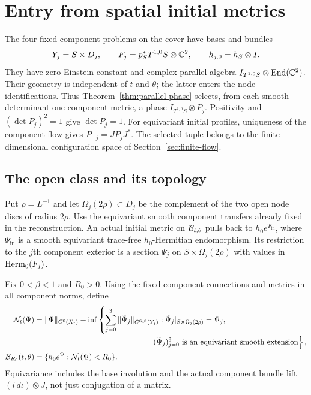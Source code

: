 \section{Entry from spatial initial metrics}\label{sec:spatial-entry}

The four fixed component problems on the cover have bases and bundles
\begin{equation}\label{eq:component-bundles}
 Y_j=S\times D_j,\qquad F_j=p_S^*T^{1,0}S\otimes\mathbb C^2,
 \qquad h_{j,0}=h_S\otimes I.
\end{equation}
They have zero Einstein constant and complex parallel algebra
$I_{T^{1,0}S}\otimes\operatorname{End}(\mathbb C^2)$. Their geometry is independent of
$t$ and $\theta$; the latter enters the node identifications. Thus
Theorem~\ref{thm:parallel-phase} selects, from each smooth
determinant-one component metric, a phase $I_{T^{1,0}S}\otimes P_j$.
Positivity and $(\det P_j)^2=1$ give $\det P_j=1$. For equivariant
initial profiles, uniqueness of the component flow gives
$P_{-j}=JP_jJ^*$. The selected tuple belongs to the finite-dimensional
configuration space of Section~\ref{sec:finite-flow}.

\subsection{The open class and its topology}
Put $\rho=L^{-1}$ and let $\Omega_j(2\rho)\subset D_j$ be the
complement of the two open node discs of radius $2\rho$. Use the
equivariant smooth component transfers already fixed in the
reconstruction. An actual initial metric on $\mathcal B_{t,\theta}$ pulls
back to $h_0e^{\Psi_{\mathrm{in}}}$, where $\Psi_{\mathrm{in}}$ is a smooth
equivariant trace-free $h_0$-Hermitian endomorphism. Its restriction to
the $j$th component exterior is a section $\Psi_j$ on
$S\times\Omega_j(2\rho)$ with values in $\operatorname{Herm}_0(F_j)$.

Fix $0<\beta<1$ and $R_0>0$. Using the fixed component connections and
metrics in all component norms, define
\begin{equation}\label{eq:extension-norm}
 \begin{split}
 \mathcal N_t(\Psi)={}&\|\Psi\|_{C^0(X_t)}+
 \inf\left\{\sum_{j=0}^3\|\widetilde\Psi_j\|_{C^{6,\beta}(Y_j)}:
       \widetilde\Psi_j|_{S\times\Omega_j(2\rho)}=\Psi_j,\right.\\[-2pt]
 &\hspace{49mm}\left.(\widetilde\Psi_j)_{j=0}^3
                    \text{ is an equivariant smooth extension}\right\},\\
 \mathcal B_{R_0}(t,\theta)={}&
       \{h_0e^{\Psi}:\mathcal N_t(\Psi)<R_0\}.
 \end{split}
\end{equation}
Equivariance includes the base involution and the actual component
bundle lift $(i\,d\iota)\otimes J$, not just conjugation of a matrix.

